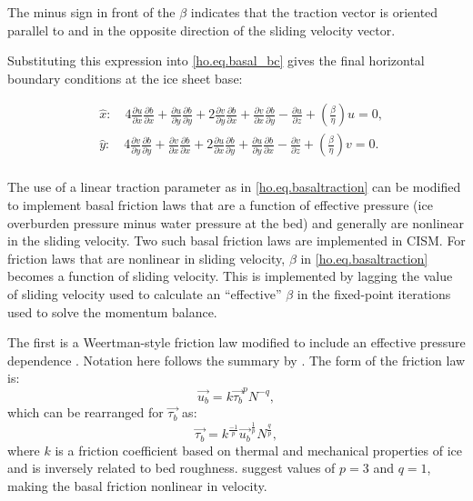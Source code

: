 \noindent
The minus sign in front of the $\beta$ indicates that the traction vector is oriented parallel to and in the opposite direction of the sliding velocity vector.

Substituting this expression into \eqref{ho.eq.basal_bc} gives the final horizontal boundary conditions at the ice sheet base:

\begin{equation}
\label{ho.eq.basal_bc_beta}
\begin{split}
  & \hat{x}:\quad 4\frac{\partial u}{\partial x}\frac{\partial b}{\partial x}+\frac{\partial u}{\partial y}\frac{\partial b}{\partial y}+2\frac{\partial v}{\partial y}\frac{\partial b}{\partial x}+\frac{\partial v}{\partial x}\frac{\partial b}{\partial y}-\frac{\partial u}{\partial z}+\left( \frac{\beta}{\eta } \right)u=0, \\ 
 & \hat{y}:\quad 4\frac{\partial v}{\partial y}\frac{\partial b}{\partial y}+\frac{\partial v}{\partial x}\frac{\partial b}{\partial x}+2\frac{\partial u}{\partial x}\frac{\partial b}{\partial y}+\frac{\partial u}{\partial y}\frac{\partial b}{\partial x}-\frac{\partial v}{\partial z}+\left( \frac{\beta}{\eta } \right)v=0. \\
\end{split}
 \end{equation}

\noindent
The use of a linear traction parameter as in \eqref{ho.eq.basaltraction} can be modified to
implement basal friction laws that are a function of effective pressure 
(ice overburden pressure minus water pressure at the bed) and 
generally are nonlinear in the sliding velocity.  Two such basal friction laws are
implemented in CISM.  For friction laws that are nonlinear in sliding velocity,
$\beta$ in \eqref{ho.eq.basaltraction} becomes a function of sliding velocity.  This is
implemented by lagging the value of sliding velocity used to calculate an ``effective'' 
$\beta$ in the fixed-point iterations used to solve the momentum balance.

The first is a Weertman-style friction law \citep{Weertman1957, Weertman1964} modified 
to include an effective pressure dependence \citep{Bindschadler1983, Budd1979}.
Notation here follows the summary by \citet[][p.240, eq. 7.17]{Cuffey2010}.  The form of
the friction law is:
\begin{equation}
  \label{ho.eq.weertmansliding}
  \vec{u_b} = k \vec{\tau_{b}}^p N^{-q},
\end{equation}
which can be rearranged for $\vec{\tau_b}$ as:
\begin{equation}
  \label{weertmansliding2}
  \vec{\tau_b} = k^\frac{-1}{p} \vec{u_b}^\frac{1}{p} N^\frac{q}{p},
\end{equation}
where $k$ is a friction coefficient based on thermal and mechanical properties of ice 
and is inversely related to bed roughness.  \citet{Cuffey2010} suggest values of 
$p=3$ and $q=1$, making the basal friction nonlinear in velocity.  

